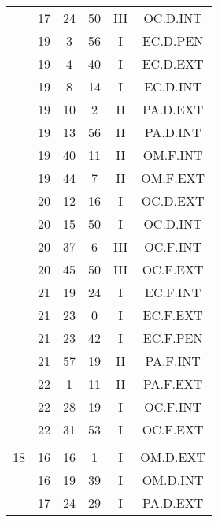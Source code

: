 \documentclass[12pt, a4paper]{article}
\begin{document}
\begin{multicols}{3}
{\begin{tabular}{c c c c c c}
	 	 	 	 & 17 & 24 & 50 & III & OC.D.INT\\%
	 	 	 	 & 19 & 3 & 56 & I & EC.D.PEN\\%
	 	 	 	 & 19 & 4 & 40 & I & EC.D.EXT\\%
	 	 	 	 & 19 & 8 & 14 & I & EC.D.INT\\%
	 	 	 	 & 19 & 10 & 2 & II & PA.D.EXT\\%
	 	 	 	 & 19 & 13 & 56 & II & PA.D.INT\\%
	 	 	 	 & 19 & 40 & 11 & II & OM.F.INT\\%
	 	 	 	 & 19 & 44 & 7 & II & OM.F.EXT\\%
	 	 	 	 & 20 & 12 & 16 & I & OC.D.EXT\\%
	 	 	 	 & 20 & 15 & 50 & I & OC.D.INT\\%
	 	 	 	 & 20 & 37 & 6 & III & OC.F.INT\\%
	 	 	 	 & 20 & 45 & 50 & III & OC.F.EXT\\%
	 	 	 	 & 21 & 19 & 24 & I & EC.F.INT\\%
	 	 	 	 & 21 & 23 & 0 & I & EC.F.EXT\\%
	 	 	 	 & 21 & 23 & 42 & I & EC.F.PEN\\%
	 	 	 	 & 21 & 57 & 19 & II & PA.F.INT\\%
	 	 	 	 & 22 & 1 & 11 & II & PA.F.EXT\\%
	 	 	 	 & 22 & 28 & 19 & I & OC.F.INT\\%
	 	 	 	 & 22 & 31 & 53 & I & OC.F.EXT\\%
	 	 	 	 & & & & & \\%
	 	 	 	18 & 16 & 16 & 1 & I & OM.D.EXT\\%
	 	 	 	 & 16 & 19 & 39 & I & OM.D.INT\\%
	 	 	 	 & 17 & 24 & 29 & I & PA.D.EXT\\%

\end{tabular}}
\end{multicols}
\end{document}
